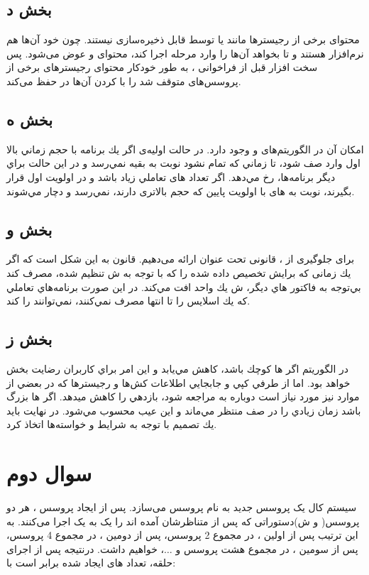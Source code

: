 \documentclass{article}
\begin{document}
\subsection{بخش د}
محتوای برخی از رجیستر‌ها مانند  یا  توسط  قابل ذخیره‌سازی نیستند. چون خود آن‌ها هم نرم‌افزار هستند و تا  بخواهد آن‌ها را وارد مرحله اجرا کند، محتوای  و  عوض می‌شود. پس سخت افزار قبل از فراخوانی  ، به طور خودکار محتوای رجیستر‌های برخی از پروسس‌های متوقف شد را با  کردن آن‌ها در  حفظ می‌کند.
\subsection{بخش ه}
امکان آن در الگوریتم‌های  و  وجود دارد. در حالت اولیه‌ی  اگر يك برنامه با حجم زماني بالا اول وارد صف شود، تا زماني كه تمام نشود نوبت به بقيه نمي‌رسد و در اين حالت براي ديگر برنامه‌ها،  رخ مي‌دهد. اگر تعداد های تعاملي زياد باشد و در اولويت اول قرار بگيرند، نوبت به های با اولويت پايين كه حجم بالاتری دارند، نمي‌رسد و دچار  مي‌شوند.
\subsection{بخش و}
برای جلوگیری از ، قانونی تحت عنوان  ارائه می‌دهیم. قانون به این شکل است که اگر يك  زمانی كه برايش تخصيص داده شده را كه با توجه به ش تنظيم شده، مصرف كند بي‌توجه به فاكتور هاي ديگر، ش يك واحد افت مي‌كند. در اين صورت برنامه‌هاي تعاملي كه يك اسلايس را تا انتها مصرف نمي‌كنند، نمي‌توانند   را  کند.
\subsection{بخش ز}
در الگوريتم  اگر ها كوچك باشد،  کاهش مي‌يابد و اين امر براي كاربران رضايت بخش خواهد بود. اما از طرفي  كپي و جابجايي اطلاعات کش‌ها و  رجیسترها كه در بعضي از موارد نيز مورد نیاز است دوباره به  مراجعه شود، بازدهي را كاهش ميدهد. اگر  ها بزرگ باشد  زمان زيادي را در صف منتظر مي‌ماند و اين عيب محسوب مي‌شود. در نهايت بايد يك تصميم با توجه به شرايط و خواسته‌ها اتخاذ كرد.

\section{سوال دوم}
\indent
سیستم کال  یک پروسس جدید به نام پروسس  می‌سازد. پس از ایجاد پروسس ، هر دو پروسس( و ش)دستوراتی که پس از  متناظرشان آمده اند را یک به یک اجرا می‌کنند. به این ترتیب پس از اولین ، در مجموع 2 پروسس، پس از دومین ، در مجموع 4 پروسس، پس از سومین ، در مجموع هشت پروسس و $\ldots$، خواهیم داشت. درنتیجه پس از اجرای حلقه، تعداد های ایجاد شده برابر است با:
\end{document}
